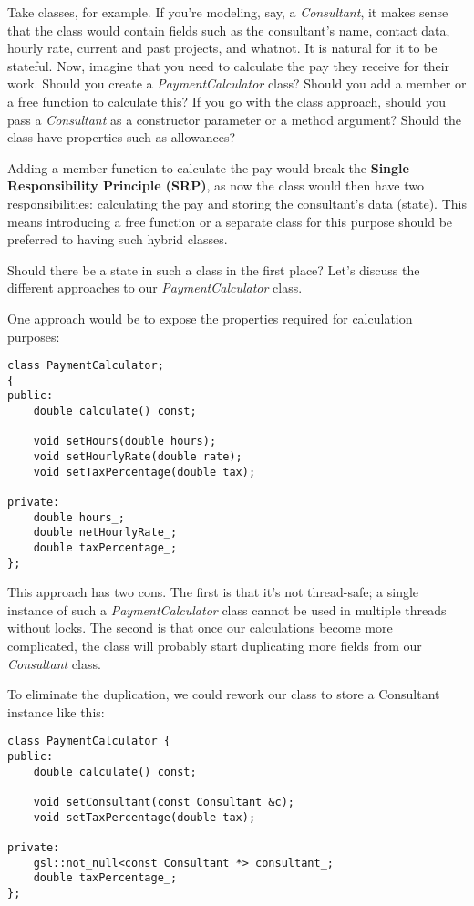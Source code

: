 Take classes, for example. If you're modeling, say, a \textit{Consultant}, it makes sense that the class would contain fields such as the consultant's name, contact data, hourly rate, current and past projects, and whatnot. It is natural for it to be stateful. Now, imagine that you need to calculate the pay they receive for their work. Should you create a \textit{PaymentCalculator} class? Should you add a member or a free function to calculate this? If you go with the class approach, should you pass a \textit{Consultant} as a constructor parameter or a method argument? Should the class have properties such as allowances?

Adding a member function to calculate the pay would break the \textbf{Single Responsibility Principle (SRP)}, as now the class would then have two responsibilities: calculating the pay and storing the consultant's data (state). This means introducing a free function or a separate class for this purpose should be preferred to having such hybrid classes.

Should there be a state in such a class in the first place? Let's discuss the different approaches to our \textit{PaymentCalculator} class.

One approach would be to expose the properties required for calculation purposes:


\begin{lstlisting}[style=styleCXX]
class PaymentCalculator;
{
public:
	double calculate() const;
	
	void setHours(double hours);
	void setHourlyRate(double rate);
	void setTaxPercentage(double tax);
	
private:
	double hours_;
	double netHourlyRate_;
	double taxPercentage_;
};

\end{lstlisting}

This approach has two cons. The first is that it's not thread-safe; a single instance of such a \textit{PaymentCalculator} class cannot be used in multiple threads without locks. The second is that once our calculations become more complicated, the class will probably start duplicating more fields from our \textit{Consultant} class.

To eliminate the duplication, we could rework our class to store a Consultant instance like this:


\begin{lstlisting}[style=styleCXX]
class PaymentCalculator {
public:
	double calculate() const;
	
	void setConsultant(const Consultant &c);
	void setTaxPercentage(double tax);
	
private:
	gsl::not_null<const Consultant *> consultant_;
	double taxPercentage_;
};
\end{lstlisting}

